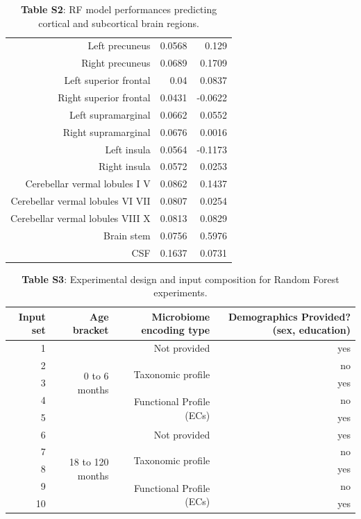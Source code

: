 \documentclass{article}
\begin{document}
\begin{table}[h]
\begin{centering}
\begin{tabular}{|r|r|r|}
		  Left precuneus & 0.0568 & 0.129 \\
		  Right precuneus & 0.0689 & 0.1709 \\
		  Left superior frontal & 0.04 & 0.0837 \\
		  Right superior frontal & 0.0431 & -0.0622 \\
		  Left supramarginal & 0.0662 & 0.0552 \\
		  Right supramarginal & 0.0676 & 0.0016 \\
		  Left insula & 0.0564 & -0.1173 \\
		  Right insula & 0.0572 & 0.0253 \\
		  Cerebellar vermal lobules I V & 0.0862 & 0.1437 \\
		  Cerebellar vermal lobules VI VII & 0.0807 & 0.0254 \\
		  Cerebellar vermal lobules VIII X & 0.0813 & 0.0829 \\
		  Brain stem & 0.0756 & 0.5976 \\
		  CSF & 0.1637 & 0.0731 \\\hline
		\end{tabular}
	\caption*{
        \textbf{Table S2}: RF model performances predicting cortical and
        subcortical brain regions.
    }
    \end{centering}
  \end{table}


\begin{table}[h]
  \begin{centering}
    \begin{tabular}{|r|r|r|r|}
      \hline\hline
      \textbf{Input set} & \textbf{Age bracket} & \textbf{Microbiome encoding type} & \textbf{Demographics Provided? (sex, education)} \\\hline
      1 & \multirow{5}{*}{0 to 6 months} & Not provided & yes \\ \cline{3-4}
      2 &  & \multirow{2}{*}{Taxonomic profile} & no \\ \cline{4-4}
      3 &  &  & yes \\ \cline{3-4}
      4 &  & \multirow{2}{*}{Functional Profile (ECs)} & no \\ \cline{4-4}
      5 &  &  & yes \\ \cline{2-4}
      6 & \multirow{5}{*}{18 to 120 months} & Not provided & yes \\ \cline{3-4}
      7 &  & \multirow{2}{*}{Taxonomic profile} & no \\ \cline{4-4}
      8 &  &  & yes \\ \cline{3-4}
      9 &  & \multirow{2}{*}{Functional Profile (ECs)} & no \\ \cline{4-4}
      10 &  &  & yes \\\hline\hline
    \end{tabular}
    \caption*{
      \textbf{Table S3}: Experimental design and input composition for Random
      Forest experiments.
    }
  \end{centering}
\end{table}
\end{document}
